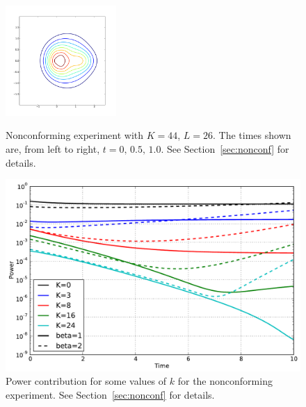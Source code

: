 \begin{figure}
{    \includegraphics[width=4.2cm]{figs/polboltz/comp2-b2-i2}
}
\caption{Nonconforming experiment with $K=44$, $L=26$.  The times shown are, from left to right,
$t=0,\,0.5,\,1.0$. See Section~\vref{sec:nonconf} for details.}
\label{fig:numpol-nc}
\end{figure}

\begin{figure}
    \centering
    \includegraphics[width=12cm]{figs/polboltz/power-comp2}
    \caption{Power contribution for some values of $k$ for the nonconforming experiment. See
    Section~\vref{sec:nonconf} for details.}
    \label{fig:numpol-nc-power}
\end{figure}


